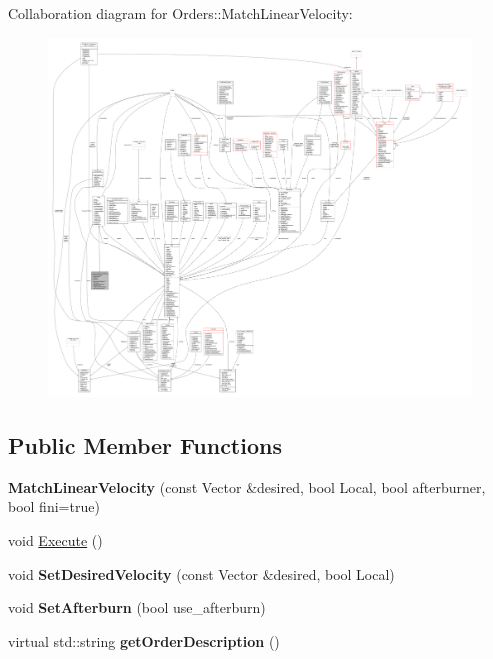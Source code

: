Collaboration diagram for Orders\+:\+:Match\+Linear\+Velocity\+:
\nopagebreak
\begin{figure}[H]
\begin{center}
\leavevmode
\includegraphics[width=350pt]{d7/db0/classOrders_1_1MatchLinearVelocity__coll__graph}
\end{center}
\end{figure}
\subsection*{Public Member Functions}
\begin{DoxyCompactItemize}
\item 
{\bfseries Match\+Linear\+Velocity} (const Vector \&desired, bool Local, bool afterburner, bool fini=true)\hypertarget{classOrders_1_1MatchLinearVelocity_a380071cb1e0fb5edc76f7bde736e7cbd}{}\label{classOrders_1_1MatchLinearVelocity_a380071cb1e0fb5edc76f7bde736e7cbd}

\item 
void \hyperlink{classOrders_1_1MatchLinearVelocity_a242ae819e1ca6b0625a1866cdd54d21e}{Execute} ()
\item 
void {\bfseries Set\+Desired\+Velocity} (const Vector \&desired, bool Local)\hypertarget{classOrders_1_1MatchLinearVelocity_a426806f09c317ebff7bfaaeecf76805c}{}\label{classOrders_1_1MatchLinearVelocity_a426806f09c317ebff7bfaaeecf76805c}

\item 
void {\bfseries Set\+Afterburn} (bool use\+\_\+afterburn)\hypertarget{classOrders_1_1MatchLinearVelocity_a80101fe6086f11baf04fcb7e61dec708}{}\label{classOrders_1_1MatchLinearVelocity_a80101fe6086f11baf04fcb7e61dec708}

\item 
virtual std\+::string {\bfseries get\+Order\+Description} ()\hypertarget{classOrders_1_1MatchLinearVelocity_ade10adb9defd8dc5517884f3458eddf3}{}\label{classOrders_1_1MatchLinearVelocity_ade10adb9defd8dc5517884f3458eddf3}

\end{DoxyCompactItemize}
